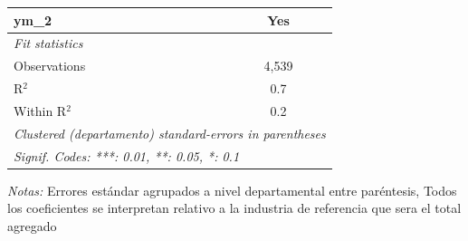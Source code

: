 \documentclass[12pt]{article}
\begin{document}
\begin{table}[htbp]
\begin{threeparttable}
\begin{tabular}{lc}
      ym\_2                                                                                                                       & Yes\\  
      \midrule
      \emph{Fit statistics}\\
      Observations                                                                                                                & 4,539\\  
      R$^2$                                                                                                                       & 0.7\\  
      Within R$^2$                                                                                                                & 0.2\\  
      \midrule \midrule
      \multicolumn{2}{l}{\emph{Clustered (departamento) standard-errors in parentheses}}\\
      \multicolumn{2}{l}{\emph{Signif. Codes: ***: 0.01, **: 0.05, *: 0.1}}\\
   \end{tabular}


\begin{tablenotes}
\footnotesize
\item \textit{Notas:} Errores estándar agrupados a nivel departamental entre paréntesis, Todos los coeficientes se interpretan relativo a la industria de referencia que sera el total agregado
\end{tablenotes}
\end{threeparttable}
\end{table}
\end{document}
